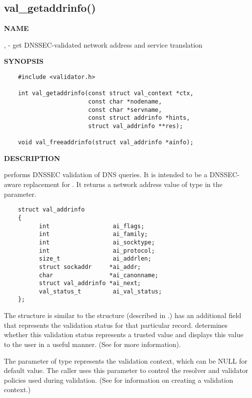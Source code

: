 \clearpage

\subsection{\bf val\_getaddrinfo()}

{\bf NAME}

,  - get DNSSEC-validated
network address and service translation

{\bf SYNOPSIS}

\begin{verbatim}
    #include <validator.h>

    int val_getaddrinfo(const struct val_context *ctx,
                        const char *nodename,
                        const char *servname,
                        const struct addrinfo *hints,
                        struct val_addrinfo **res);

    void val_freeaddrinfo(struct val_addrinfo *ainfo);
\end{verbatim}

{\bf DESCRIPTION}

 performs DNSSEC validation of DNS queries.
It is intended to be a DNSSEC-aware replacement for .
It returns a network address value of type 
in the  parameter.

\begin{verbatim}
    struct val_addrinfo
    {
          int                  ai_flags;
          int                  ai_family;
          int                  ai_socktype;
          int                  ai_protocol;
          size_t               ai_addrlen;
          struct sockaddr     *ai_addr;
          char                *ai_canonname;
          struct val_addrinfo *ai_next;
          val_status_t         ai_val_status;
    };
\end{verbatim}

The  structure is similar to the 
structure (described in .)   has an
additional field  that represents the validation status
for that particular record.   determines whether this
validation status represents a trusted value and 
displays this value to the user in a useful manner.  (See 
for more information).

The  parameter of type  represents the validation
context, which can be NULL for default value.  The caller uses this parameter
to control the resolver and validator policies used during validation.
(See  for information on creating a validation context.)

